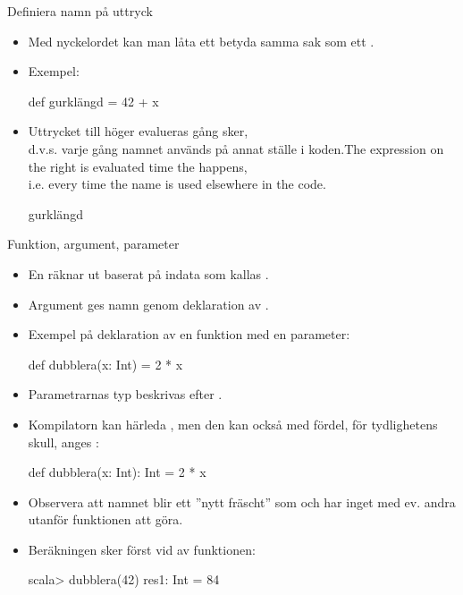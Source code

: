 
\begin{Slide}{Definiera namn på uttryck}
\begin{itemize}
\item Med nyckelordet  kan man låta ett  betyda samma sak som ett .
\item Exempel:
\begin{Code}
def gurklängd = 42 + x
\end{Code}
\item \ifswedish Uttrycket till höger evalueras  gång  sker,\\
d.v.s. varje gång namnet används på annat ställe i koden.\else The expression on the right is evaluated  time the  happens,\\
i.e. every time the name is used elsewhere in the code.\fi
\begin{Code}
gurklängd
\end{Code}

\end{itemize}
\end{Slide}

\begin{Slide}{Funktion, argument, parameter}\SlideFontSmall
\begin{itemize}
\item En  räknar ut  baserat på indata som kallas .

\item Argument ges namn genom deklaration av .

\item Exempel på deklaration av en funktion med en parameter:
\begin{Code}
def dubblera(x: Int) = 2 * x
\end{Code}

\item Parametrarnas typ  beskrivas efter .
\item Kompilatorn kan härleda , men den kan också med fördel, för tydlighetens skull, anges :
\begin{Code}
def dubblera(x: Int): Int = 2 * x
\end{Code}

\item Observera att namnet  blir ett ''nytt fräscht''  som  och har inget med ev. andra  utanför funktionen att göra.

\item Beräkningen sker först vid  av funktionen:
\begin{REPL}
scala> dubblera(42)
res1: Int = 84
\end{REPL}

\end{itemize}
\end{Slide}






